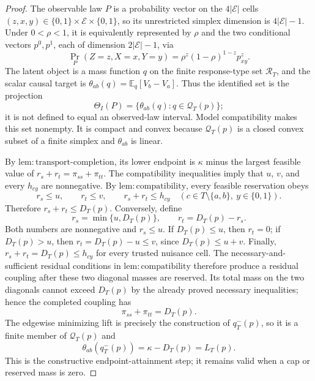 \documentclass{article}
\begin{document}
\begin{proof}
The observable law \(P\) is a probability vector on the
\(4|\mathcal E|\) cells \((z,x,y)\in\{0,1\}\times\mathcal E\times\{0,1\}\),
so its unrestricted simplex dimension is \(4|\mathcal E|-1\).  Under
\(0<\rho<1\), it is equivalently represented by \(\rho\) and the two
conditional vectors \(p^0,p^1\), each of dimension \(2|\mathcal E|-1\), via
\[
 \Pr_P(Z=z,X=x,Y=y)=\rho^z(1-\rho)^{1-z}p^z_{xy}.
\]
The latent object is a mass function \(q\) on the finite response-type set
\(\mathcal R_T\), and the scalar causal target is
\(\theta_{ab}(q)=\mathbb E_q[V_b-V_a]\).  Thus the identified set is the
projection
\[
 \Theta_I(P)=\{\theta_{ab}(q):q\in\mathcal Q_T(p)\};
\]
it is not defined to equal an observed-law interval.  Model compatibility
makes this set nonempty.  It is compact and convex because
\(\mathcal Q_T(p)\) is a closed convex subset of a finite simplex and
\(\theta_{ab}\) is linear.

By \(\mathrm{lem{:}transport\mbox{-}completion}\), its lower endpoint is
\(\kappa\) minus the largest feasible value of
\(r_s+r_t=\pi_{ss}+\pi_{tt}\).  The compatibility inequalities imply that
\(u\), \(v\), and every \(h_{cy}\) are nonnegative.  By
\(\mathrm{lem{:}compatibility}\), every feasible reservation obeys
\[
 r_s\le u,\qquad r_t\le v,
 \qquad r_s+r_t\le h_{cy}
 \quad(c\in T\setminus\{a,b\},\ y\in\{0,1\}).
\]
Therefore \(r_s+r_t\le D_T(p)\).  Conversely, define
\[
 r_s=\min\{u,D_T(p)\},\qquad r_t=D_T(p)-r_s.
\]
Both numbers are nonnegative and \(r_s\le u\).  If \(D_T(p)\le u\), then
\(r_t=0\); if \(D_T(p)>u\), then
\(r_t=D_T(p)-u\le v\), since \(D_T(p)\le u+v\).  Finally,
\(r_s+r_t=D_T(p)\le h_{cy}\) for every trusted nuisance cell.  The
necessary-and-sufficient residual conditions in
\(\mathrm{lem{:}compatibility}\) therefore produce a residual coupling
after these two diagonal masses are reserved.  Its total mass on the two
diagonals cannot exceed \(D_T(p)\) by the already proved necessary
inequalities; hence the completed coupling has
\[
 \pi_{ss}+\pi_{tt}=D_T(p).
\]
The edgewise minimizing lift is precisely the construction of
\(q^-_T(p)\), so it is a finite member of \(\mathcal Q_T(p)\) and
\[
 \theta_{ab}(q^-_T(p))=\kappa-D_T(p)=L_T(p). \tag{1}
\]
This is the constructive endpoint-attainment step; it remains valid when a
cap or reserved mass is zero.


\end{proof}
\end{document}
